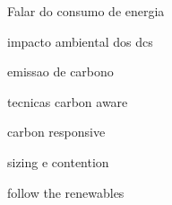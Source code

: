 Falar do consumo de energia

impacto ambiental dos dcs

emissao de carbono

tecnicas carbon aware

carbon responsive

sizing e contention

follow the renewables


